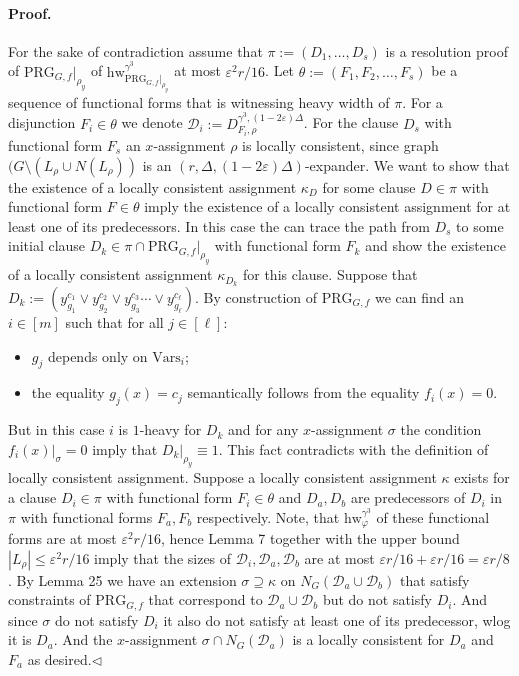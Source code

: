 \documentclass[10pt,a4paper]{article}
\begin{document}
\paragraph{Proof.} For the sake of contradiction assume that $\pi:=(D_1,\ldots,D_s)$ is a resolution proof of $\mathrm{PRG}_{G,f}|_{\rho_y}$ of $\mathrm{hw}_{\mathrm{PRG}_{G,f}|_{\rho_y}}^{\gamma^3}$ at most $\varepsilon^2r/16$. Let $\theta:=(F_1,F_2,\ldots,F_s)$ be a sequence of functional forms that is witnessing heavy width of $\pi$. For a disjunction $F_i\in\theta$ we denote $\mathcal D_i:=D_{F_i,\rho}^{\gamma^3,(1-2\varepsilon)\Delta}$.
For the clause $D_s$ with functional form $F_s$ an $x$-assignment $\rho$ is locally consistent, since graph $(G\setminus(L_\rho\cup N(L_\rho))$ is an $(r,\Delta,(1-2\varepsilon)\Delta)$-expander. We want to show that the existence of a locally consistent assignment $\kappa_D$ for some clause $D\in\pi$ with functional form $F\in\theta$ imply the existence of a locally consistent assignment for at least one of its predecessors. In this case the can trace the path from $D_s$ to some initial clause $D_k\in\pi\cap\mathrm{PRG}_{G,f}|_{\rho_y}$ with functional form $F_k$ and show the existence of a locally consistent assignment $\kappa_{D_k}$ for this clause.
Suppose that $D_k:=(y_{g_1}^{c_1}\vee y_{g_2}^{c_2}\vee y_{g_3}^{c_3}\cdots\vee y_{g_\ell}^{c_\ell})$. By construction of $\mathrm{PRG}_{G,f}$ we can find an $i\in[m]$ such that for all $j\in[\ell]$:
\begin{itemize}
\item $g_j$ depends only on $\mathrm{Vars}_i$;
\item the equality $g_j(x)=c_j$ semantically follows from the equality $f_i(x)=0$.
\end{itemize}
But in this case $i$ is $1$-heavy for $D_k$ and for any $x$-assignment $\sigma$ the condition $f_i(x)|_\sigma=0$ imply that $D_k|_{\rho_y}\equiv1$. This fact contradicts with the definition of locally consistent assignment.
Suppose a locally consistent assignment $\kappa$ exists for a clause $D_i\in\pi$ with functional form $F_i\in\theta$ and $D_a,D_b$ are predecessors of $D_i$ in $\pi$ with functional forms $F_a,F_b$ respectively. Note, that $\mathrm{hw}_{\varphi}^{\gamma^3}$ of these functional forms are at most $\varepsilon^2r/16$, hence Lemma 7 together with the upper bound $|L_\rho|\leq\varepsilon^2r/16$ imply that the sizes of $\mathcal D_i,\mathcal D_a,\mathcal D_b$ are at most $\varepsilon r/16+\varepsilon r/16=\varepsilon r/8$. By Lemma 25 we have an extension $\sigma\supseteq\kappa$ on $N_G(\mathcal D_a\cup\mathcal D_b)$ that satisfy constraints of $\mathrm{PRG}_{G,f}$ that correspond to $\mathcal D_a\cup\mathcal D_b$ but do not satisfy $D_i$. And since $\sigma$ do not satisfy $D_i$ it also do not satisfy at least one of its predecessor, wlog it is $D_a$. And the $x$-assignment $\sigma\cap N_G(\mathcal D_a)$ is a locally consistent for $D_a$ and $F_a$ as desired.\hfill$\triangleleft$
\end{document}
